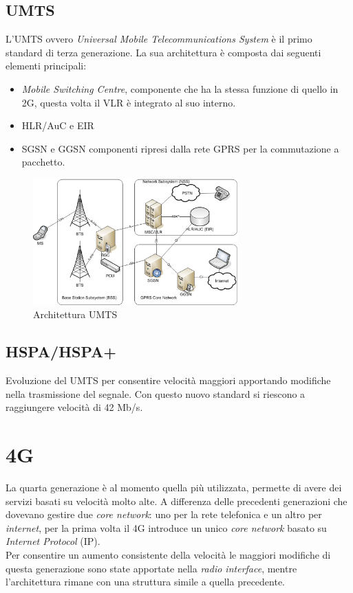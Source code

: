 \subsection{UMTS}
L'UMTS ovvero \textit{Universal Mobile Telecommunications System}\cite{umts} è il primo standard di terza generazione.
La sua architettura è composta dai seguenti elementi principali:
\begin{itemize}
    \item \textit{Mobile Switching Centre}, componente che ha la stessa funzione di quello in 2G, questa volta il VLR è integrato al suo interno.
    \item HLR/AuC e EIR
    \item SGSN e GGSN componenti ripresi dalla rete GPRS per la commutazione a pacchetto.
\end{itemize}
\begin{figure}[ht]
    \centering
    \includegraphics[width=0.7\textwidth]{images/3g-umts.png}
    \caption{Architettura UMTS}
\end{figure}


\subsection{HSPA/HSPA+}
Evoluzione del UMTS per consentire velocità maggiori apportando modifiche nella trasmissione del segnale.
Con questo nuovo standard si riescono a raggiungere velocità di 42 Mb/s\cite{hspa}.

\clearpage

\section{4G}
La quarta generazione è al momento quella più utilizzata, permette di avere dei servizi basati su velocità molto alte. 
A differenza delle precedenti generazioni che dovevano gestire due \textit{core network}: uno per la rete telefonica e un altro
per \textit{internet}, per la prima volta il 4G introduce un unico \textit{core network} basato su \textit{Internet Protocol} (IP).\\
Per consentire un aumento consistente della velocità le maggiori modifiche di questa generazione sono state apportate nella \textit{radio interface}, mentre
l'architettura rimane con una struttura simile a quella precedente.
